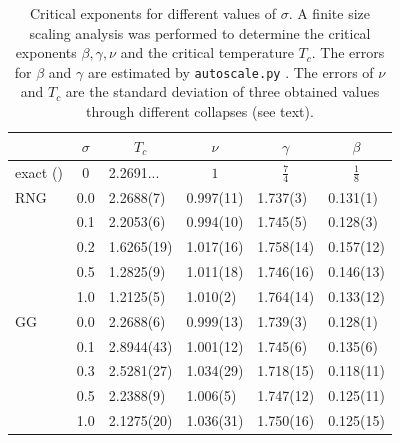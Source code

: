     \begin{table}[htbp]
        \center
        \begin{tabular}{l l l l l l}
            \toprule
             & \multicolumn{1}{c}{\(\sigma\)} & \multicolumn{1}{c}{\(T_c\)} & \multicolumn{1}{c}{\(\nu\)} & \multicolumn{1}{c}{\(\gamma\)} & \multicolumn{1}{c}{\(\beta\)}\\
            \midrule
            exact (\cite[p. 59]{Pelissetto2002}) & \multicolumn{1}{c}{\(0\)} & 2.2691... & \multicolumn{1}{c}{\(1\)} & \multicolumn{1}{c}{\(\frac{7}{4}\)} & \multicolumn{1}{c}{\(\frac{1}{8}\)}\\
            \midrule
            RNG          & 0.0 & 2.2688(7) & 0.997(11)& 1.737(3) & 0.131(1) \\
                         & 0.1 & 2.2053(6) & 0.994(10)& 1.745(5) & 0.128(3) \\
                         & 0.2 & 1.6265(19)& 1.017(16)& 1.758(14)& 0.157(12)\\
                         & 0.5 & 1.2825(9) & 1.011(18)& 1.746(16)& 0.146(13)\\
                         & 1.0 & 1.2125(5) & 1.010(2) & 1.764(14)& 0.133(12)\\
            \midrule
            GG           & 0.0 & 2.2688(6) & 0.999(13)& 1.739(3) & 0.128(1)\\
                         & 0.1 & 2.8944(43)& 1.001(12)& 1.745(6) & 0.135(6) \\
                         & 0.3 & 2.5281(27)& 1.034(29)& 1.718(15)& 0.118(11)\\
                         & 0.5 & 2.2388(9) & 1.006(5) & 1.747(12)& 0.125(11)\\
                         & 1.0 & 2.1275(20)& 1.036(31)& 1.750(16)& 0.125(15)\\

            \bottomrule
        \end{tabular}
        \caption[Critical Exponents for Different $\sigma$]{
            Critical exponents for different values of \(\sigma\). A finite size
            scaling analysis was performed to determine the critical
            exponents \(\beta, \gamma, \nu\) and the critical temperature
            \(T_c\). The errors for \(\beta\) and \(\gamma\) are estimated
            by \texttt{autoscale.py} \cite{autoscale2009}. The errors of
            \(\nu\) and \(T_c\) are the standard deviation of three obtained
            values through different collapses (see text).
        }
        \label{tab:critExp}
    \end{table}\\
